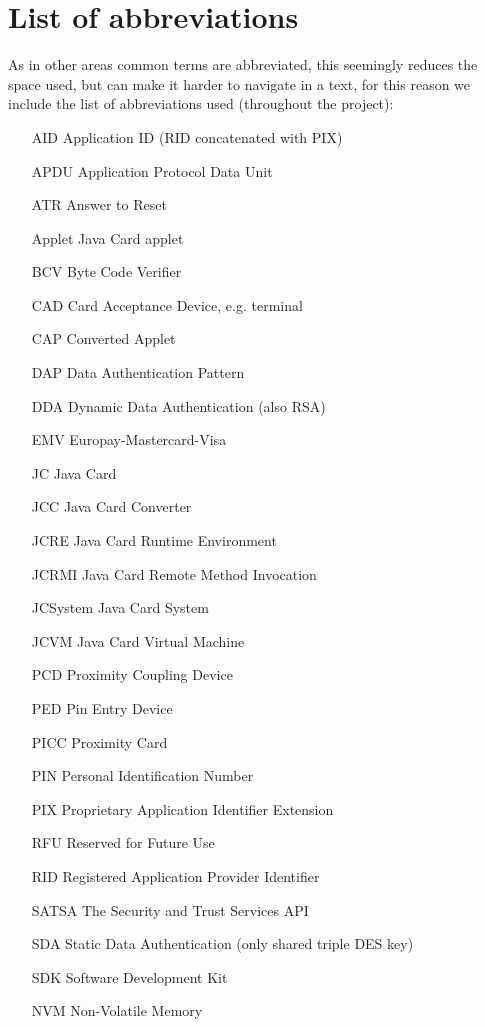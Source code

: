 \documentclass[a4paper]{scrartcl}
\subtitle{}
\begin{document}
\section*{List of abbreviations}
As in other areas common terms are abbreviated, this seemingly reduces the space used, but can make it harder to navigate in a text, for this reason we include the list of abbreviations used (throughout the project):
\begin{itemize}
    \item[AID] Application ID (RID concatenated with PIX)
    \item[APDU] Application Protocol Data Unit
    \item[ATR] Answer to Reset
    \item[Applet] Java Card applet
    \item[BCV] Byte Code Verifier
    \item[CAD] Card Acceptance Device, e.g. terminal
    \item[CAP] Converted Applet
    \item[DAP] Data Authentication Pattern
    \item[DDA] Dynamic Data Authentication (also RSA)
    \item[EMV] Europay-Mastercard-Visa
    \item[JC] Java Card
    \item[JCC] Java Card Converter
    \item[JCRE] Java Card Runtime Environment
    \item[JCRMI] Java Card Remote Method Invocation
    \item[JCSystem] Java Card System
    \item[JCVM] Java Card Virtual Machine
    \item[PCD] Proximity Coupling Device
    \item[PED] Pin Entry Device
    \item[PICC] Proximity Card
    \item[PIN] Personal Identification Number
    \item[PIX] Proprietary Application Identifier Extension
    \item[RFU] Reserved for Future Use
    \item[RID] Registered Application Provider Identifier
    \item[SATSA] The Security and Trust Services API
    \item[SDA] Static Data Authentication (only shared triple DES key)
    \item[SDK] Software Development Kit
    \item[NVM] Non-Volatile Memory
\end{itemize}
\end{document}
